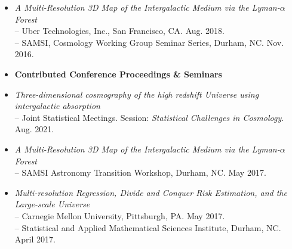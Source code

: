 \documentclass[letterpaper,10pt]{article}
\begin{document}
\begin{itemize}
\vspace{0.1cm}

\item {\it A Multi-Resolution 3D Map of the Intergalactic Medium via the Lyman-$\alpha$ Forest}\\
\hspace{0.9em}-- Uber Technologies, Inc., San Francisco, CA. Aug. 2018.\\
\hspace{0.9em}-- SAMSI, Cosmology Working Group Seminar Series, Durham, NC. Nov. 2016.

\vspace{0.2cm}

\item[] \hspace{-4ex} {\bf Contributed Conference Proceedings \& Seminars} 

\item {\it Three-dimensional cosmography of the high redshift Universe using intergalactic absorption}\\
\hspace{0.9em}-- Joint Statistical Meetings. Session: {\it Statistical Challenges in Cosmology}. Aug. 2021.

\vspace{0.1cm}

\item {\it A Multi-Resolution 3D Map of the Intergalactic Medium via the Lyman-$\alpha$ Forest}\\
\hspace{0.9em}-- SAMSI Astronomy Transition Workshop, Durham, NC. May 2017.

\vspace{0.1cm}

\item {\it Multi-resolution Regression, Divide and Conquer Risk Estimation, and the Large-scale Universe}\\
\hspace{0.9em}-- Carnegie Mellon University, Pittsburgh, PA. May 2017.\\
\hspace{0.9em}-- Statistical and Applied Mathematical Sciences Institute, Durham, NC. April 2017.


\end{itemize}
\end{document}
